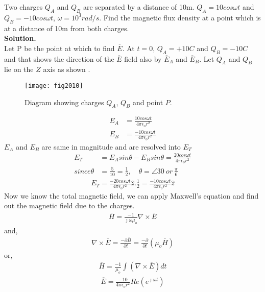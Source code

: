   \begin{exmp}
  	Two charges $Q_A$ and $Q_B$ are separated by a distance of 10m. $Q_A = 10cos\omega t$ and $Q_B = -10cos\omega t$, $\omega = 10^3 rad/s$. Find the magnetic flux density at a point which is at a distance of 10m from both charges.\\
  	\textbf{Solution.} \\
  	Let P be the point at which to find $\overline{E}$. At $t = 0$, $Q_A = +10C$ and $Q_B = -10C$ and that shows the direction of the $\overline{E}$ field also by $\overline{E}_{A}$ and $\overline{E}_{B}$. Let $Q_A$ and $Q_B$ lie on the $Z$ axis as shown .
  	\begin{figure}[h]
  		\centering
  		\texttt{[image: fig2010]}
  		\caption{Diagram showing charges $Q_A$, $Q_B$ and point $P$.}
  	\end{figure}
  \begin{align*}
  E_A &= \frac{10cos\omega t}{4\pi\epsilon_or^2}\\
  E_B &= \frac{-10cos\omega t}{4\pi\epsilon_o r^2}
  \end{align*}
  $E_A$ and $E_B$ are same in magnitude and are resolved into $E_T$
  \begin{align*}
  E_T &= E_Asin\theta - E_Bsin\theta = \frac{20cos\omega t}{4\pi\epsilon_o r^2} \\
  since \theta &= \frac{5}{10} = \frac{1}{2}, \quad \theta = \angle {30} \ or \ \frac{\pi}{6}
  \end{align*}
  \begin{align*}
  E_T = \frac{-20cos\omega t}{4\pi\epsilon_o r^2}\hat{z}.\frac{1}{2} = \frac{-10cos\omega t}{4\pi\epsilon_o r^2}\hat{z}
  \end{align*}
  Now we know the total magnetic field, we can apply Maxwell's equation and find out the magnetic field due to the charges.
  \begin{align*}
  \overline{H} = \frac{-1}{\jmath\omega\mu_o}\nabla\times\overline{E}
  \end{align*}
  and,
  \begin{align*}
  \nabla\times\overline{E} = \frac{-\partial\overline{B}}{\partial t} = \frac{-\partial}{\partial t}(\mu_o\overline{H})
  \end{align*}
  or,
  \begin{align*}
  \overline{H} = \frac{-1}{\mu_o}\int(\nabla\times\overline{E})dt
  \end{align*}
  \begin{align*}
  \overline{E} = \frac{-10}{4\pi\epsilon_o r^2}Re(e^{\jmath\omega t})

\end{align*}
\end{exmp}
